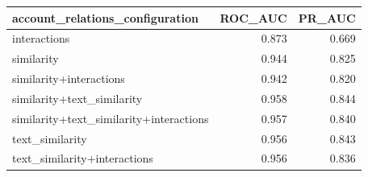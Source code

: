 \begin{tabular}{lrr}
\toprule
account\_relations\_configuration & ROC\_AUC & PR\_AUC \\
\midrule
interactions & 0.873 & 0.669 \\
similarity & 0.944 & 0.825 \\
similarity+interactions & 0.942 & 0.820 \\
similarity+text\_similarity & 0.958 & 0.844 \\
similarity+text\_similarity+interactions & 0.957 & 0.840 \\
text\_similarity & 0.956 & 0.843 \\
text\_similarity+interactions & 0.956 & 0.836 \\
\bottomrule
\end{tabular}
